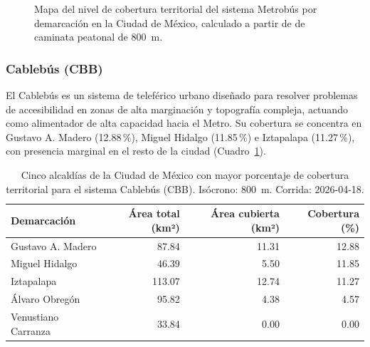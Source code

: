 \begin{figure}[H]
    \centering
    \caption[Mapa de cobertura territorial del Metrobús en la CDMX]{Mapa del
    nivel de cobertura territorial del sistema Metrobús por demarcación en la
    Ciudad de México, calculado a partir de  de caminata
    peatonal de 800~m.}
    \label{fig:mapa-cobertura-mb}
\end{figure}

\subsubsection{Cablebús (CBB)}
\label{subsubsec:cobertura-cbb}

El Cablebús es un sistema de teleférico urbano diseñado para resolver problemas de
accesibilidad en zonas de alta marginación y topografía compleja, actuando como
alimentador de alta capacidad hacia el Metro. Su cobertura se concentra en
Gustavo A. Madero (12.88\,\%), Miguel Hidalgo (11.85\,\%) e Iztapalapa
(11.27\,\%), con presencia marginal en el resto de la ciudad
(Cuadro~\ref{tab:cobertura-cbb-cdmx}).

\begin{table}[H]
    \centering
    \caption[Alcaldías con mayor cobertura de Cablebús (CDMX)]{
    Cinco alcaldías de la Ciudad de México con mayor porcentaje de cobertura
    territorial para el sistema Cablebús (CBB). Isócrono: 800~m.
    Corrida: 2026-04-18.}
    \label{tab:cobertura-cbb-cdmx}
    \begin{tabular}{|l|r|r|r|}
        \hline
        \textbf{Demarcación} & \textbf{Área total (km²)} & \textbf{Área cubierta (km²)} & \textbf{Cobertura (\%)} \\
        \hline
        Gustavo A. Madero   &  87.84 & 11.31 &  12.88 \\
        Miguel Hidalgo      &  46.39 &  5.50 &  11.85 \\
        Iztapalapa          & 113.07 & 12.74 &  11.27 \\
        Álvaro Obregón      &  95.82 &  4.38 &   4.57 \\
        Venustiano Carranza &  33.84 &  0.00 &   0.00 \\
        \hline
    \end{tabular}
\end{table}

